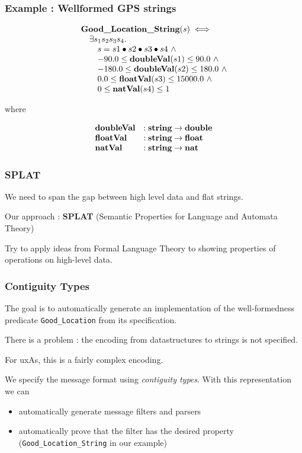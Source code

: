 \documentclass{beamer}
\newcommand{\konst}[1]{\ensuremath{\mbox{\bf{#1}}}}
\begin{document}
\begin{frame}\frametitle{Example : Wellformed GPS strings}

\[
\begin{array}{l}
 \konst{Good\_Location\_String} (s) \iff \\
\quad   \exists s_1 s_2 s_3 s_4. \\
\qquad      s = s1 \bullet s2 \bullet s3 \bullet s4 \ \land \\
\qquad    -90.0 \leq \konst{doubleVal}(s1) \leq 90.0 \ \land \\
\qquad   -180.0 \leq \konst{doubleVal}(s2) \leq 180.0 \ \land \\
\qquad      0.0 \leq \konst{floatVal}(s3)  \leq 15000.0 \ \land \\
\qquad        0 \leq \konst{natVal}(s4) \leq 1
\end{array}
\]

\noindent where

\[
\begin{array}{ll}
 \konst{doubleVal} & : \konst{string} \to \konst{double} \\
 \konst{floatVal}  & : \konst{string} \to \konst{float}  \\
 \konst{natVal}    & : \konst{string} \to \konst{nat}  \\
\end{array}
\]

\end{frame}

\begin{frame}\frametitle{SPLAT}

We need to span the gap between high level data and flat strings.

Our approach : \textbf{SPLAT} (Semantic Properties for Language and Automata Theory)

Try to apply ideas from Formal Language Theory to showing properties
of operations on high-level data.

\end{frame}


\begin{frame}[fragile]\frametitle{Contiguity Types}

The goal is to automatically generate an implementation of the
well-formedness predicate \verb+Good_Location+ from its specification.

There is a problem : the encoding from datastructures to strings is not specified.

For uxAs, this is a fairly complex encoding.

We specify the message format using \emph{contiguity types}. With this representation we can
\begin{itemize}
\item automatically generate message filters and parsers
\item automatically prove that the filter has the desired property (\verb+Good_Location_String+ in our example)
\end{itemize}

\end{frame}
\end{document}
